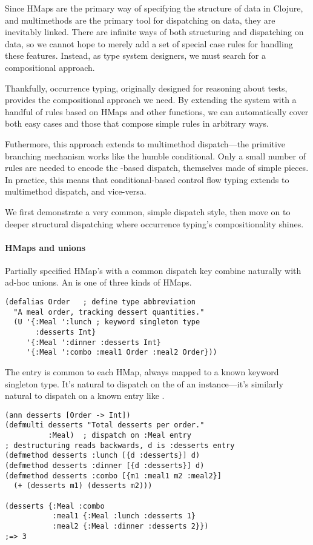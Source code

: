 Since HMaps are the primary way of specifying the structure of data in Clojure,
and multimethods are the primary tool for dispatching on data, they are inevitably
linked.
There are infinite ways of both structuring and dispatching on data,
so we cannot hope to merely add a set of special case rules for
handling these features. Instead, as type system designers, we must
search for a compositional approach.

Thankfully, occurrence typing, originally designed for reasoning about
 tests, provides the compositional approach we need.
By extending the system with
a handful of rules based on HMaps and other functions, 
we can automatically cover both easy cases and those
that compose simple rules in arbitrary ways.

Futhermore, this approach extends to multimethod dispatch---the primitive branching
mechanism works like the humble  conditional. 
Only a small number of rules are needed
to encode the -based dispatch, themselves made of simple pieces.
In practice, this means that conditional-based control flow typing
 extends to  multimethod dispatch, and vice-versa.

We first demonstrate a very common, simple dispatch style,
then move on to deeper structural dispatching where occurrence typing's
compositionality shines.

\paragraph{HMaps and unions} Partially specified HMap's with a common dispatch key
combine naturally with ad-hoc unions.
An  is one of three kinds of HMaps.

\begin{verbatim}
(defalias Order   ; define type abbreviation
  "A meal order, tracking dessert quantities."
  (U '{:Meal ':lunch ; keyword singleton type
       :desserts Int}
     '{:Meal ':dinner :desserts Int}
     '{:Meal ':combo :meal1 Order :meal2 Order}))
\end{verbatim}

The  entry is common to each HMap, always mapped to a known keyword singleton
type.
It's natural to dispatch on the  of an instance---it's similarly
natural to dispatch on a known entry like .

\begin{exmp}
\begin{verbatim}
(ann desserts [Order -> Int])
(defmulti desserts "Total desserts per order."
          :Meal)  ; dispatch on :Meal entry
; destructuring reads backwards, d is :desserts entry
(defmethod desserts :lunch [{d :desserts}] d)
(defmethod desserts :dinner [{d :desserts}] d)
(defmethod desserts :combo [{m1 :meal1 m2 :meal2}]
  (+ (desserts m1) (desserts m2)))

(desserts {:Meal :combo 
           :meal1 {:Meal :lunch :desserts 1}
           :meal2 {:Meal :dinner :desserts 2}})
;=> 3
\end{verbatim}
\label{example:desserts-on-meal}
\end{exmp}

